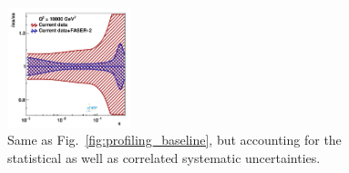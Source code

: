 \begin{figure}[t]
\includegraphics[width=0.32\textwidth]{plots/proton_fasernu2/inclusive+charm_chargediscrimination/syst_FASERv2_q2_10000_pdf_s_ratio.pdf}
\caption{Same as Fig.~\ref{fig:profiling_baseline}, 
but accounting for the statistical as well as correlated systematic uncertainties.
}
\label{fig:profiling_syst}
\end{figure}

